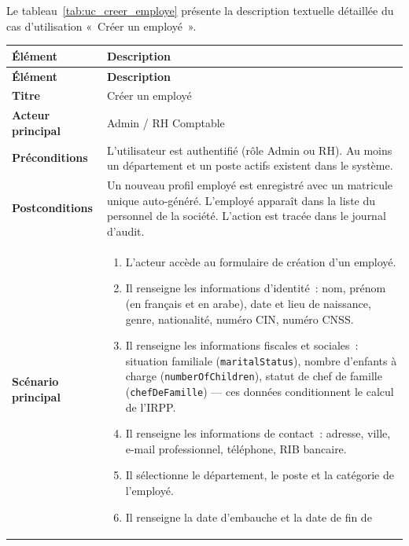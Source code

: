 Le tableau~\ref{tab:uc_creer_employe} présente la description textuelle
détaillée du cas d'utilisation «~Créer un employé~».
\vspace{0.2cm}
\begin{xltabular}{\textwidth}{|l|X|}
    \hline
     \textbf{Élément} & \textbf{Description} \\ \hline
    \endfirsthead
    \hline
     \textbf{Élément} & \textbf{Description} \\ \hline
    \endhead
    \hline
    \endfoot
    \endlastfoot

    \textbf{Titre} & Créer un employé \\ \hline
    \textbf{Acteur principal} & Admin / RH Comptable \\ \hline
    \textbf{Préconditions} & L'utilisateur est authentifié (rôle Admin ou RH).
        Au moins un département et un poste actifs existent dans le système. \\ \hline
    \textbf{Postconditions} & Un nouveau profil employé est enregistré avec un
        matricule unique auto-généré. L'employé apparaît dans la liste du personnel
        de la société. L'action est tracée dans le journal d'audit. \\ \hline
    \textbf{Scénario principal} &
    \begin{enumerate}[nosep, leftmargin=*]
        \item L'acteur accède au formulaire de création d'un employé.
        \item Il renseigne les informations d'identité~: nom, prénom
              (en français et en arabe), date et lieu de naissance,
              genre, nationalité, numéro CIN, numéro CNSS.
        \item Il renseigne les informations fiscales et sociales~:
              situation familiale (\texttt{maritalStatus}), nombre
              d'enfants à charge (\texttt{numberOfChildren}), statut
              de chef de famille (\texttt{chefDeFamille}) ---
              ces données conditionnent le calcul de l'IRPP.
        \item Il renseigne les informations de contact~: adresse,
              ville, e-mail professionnel, téléphone, RIB bancaire.
        \item Il sélectionne le département, le poste et la catégorie
              de l'employé.
        \item Il renseigne la date d'embauche et la date de fin de

\end{enumerate}
\end{xltabular}

